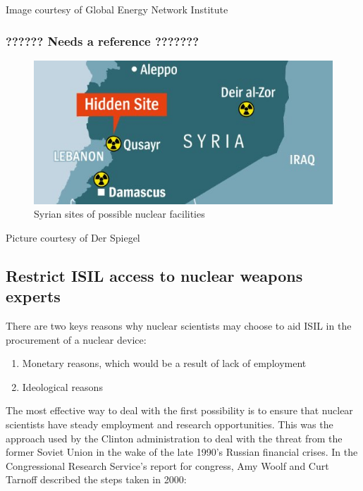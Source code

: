 \documentclass{report}
\begin{document}
Image courtesy of Global Energy Network Institute




\subsubsection{??????  Needs a reference   ???????}

\begin{figure}[H]
 \centering
 \includegraphics[trim = 0cm 0cm 0cm 0cm, clip,scale=0.7]{./figures/syria_nuke_facilities.jpg}
   \caption{Syrian sites of possible nuclear facilities}
     \label{fig:syria_nuke_facilities}
\end{figure}




Picture courtesy of Der Spiegel






\subsection{Restrict ISIL access to nuclear weapons experts}

There are two keys reasons why nuclear scientists may choose to aid ISIL in the procurement of a nuclear device:

\begin{enumerate}
  \item Monetary reasons, which would be a result of lack of employment
  \item Ideological reasons
\end{enumerate}


The most effective way to deal with the first possibility is to ensure that nuclear scientists have steady employment and research opportunities. This was the approach used by the Clinton administration to deal with the threat from the former Soviet Union in the wake of the late 1990’s Russian financial crises. In the Congressional Research Service’s report for congress, Amy Woolf and Curt Tarnoff described the steps taken in 2000:
\end{document}
